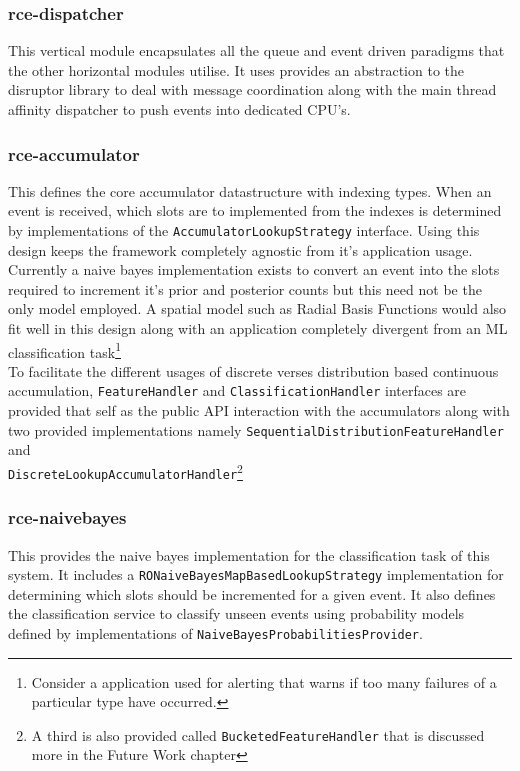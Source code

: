 \documentclass[a4paper,11pt]{scrreprt}
\begin{document}
\subsubsection{rce-dispatcher}
This vertical module encapsulates all the queue and event driven paradigms that the other horizontal modules utilise. It uses provides an abstraction to the disruptor library to deal with message coordination along with the main thread affinity dispatcher to push events into dedicated CPU's.

\subsubsection{rce-accumulator}
This defines the core accumulator datastructure with indexing types. When an event is received, which slots are to implemented from the indexes is determined by implementations of the \verb|AccumulatorLookupStrategy| interface. Using this design keeps the framework completely agnostic from it's application usage. Currently a naive bayes implementation exists to convert an event into the slots required to increment it's prior and posterior counts but this need not be the only model employed. A spatial model such as Radial Basis Functions would also fit well in this design along with an application completely divergent from an ML classification task\footnote{Consider a application used for alerting that warns if too many failures of a particular type have occurred.}\\
To facilitate the different usages of discrete verses distribution based continuous accumulation, \verb|FeatureHandler| and \verb|ClassificationHandler| interfaces are provided that self as the public API interaction with the accumulators along with two provided implementations namely \verb|SequentialDistributionFeatureHandler| and\\ \verb|DiscreteLookupAccumulatorHandler|\footnote{A third is also provided called \verb|BucketedFeatureHandler| that is discussed more in the Future Work chapter}

\subsubsection{rce-naivebayes}
This provides the naive bayes implementation for the classification task of this system. It includes a \verb|RONaiveBayesMapBasedLookupStrategy| implementation for determining which slots should be incremented for a given event. It also defines the classification service to classify unseen events using probability models defined by implementations of \verb|NaiveBayesProbabilitiesProvider|.
\end{document}
